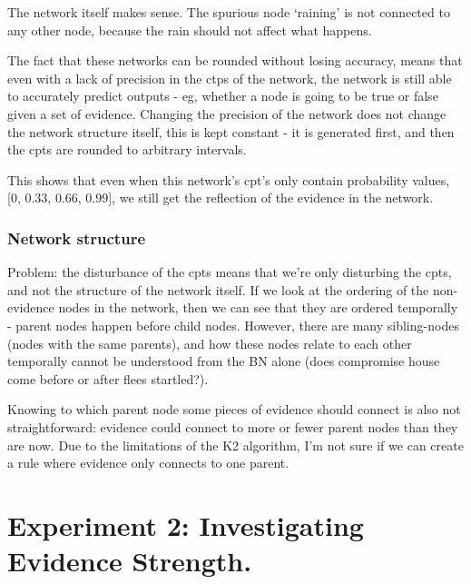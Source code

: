 The network itself makes sense. The spurious node `raining' is not connected to any other node, because the rain should not affect what happens.

The fact that these networks can be rounded without losing accuracy, means that even with a lack of precision in the ctps of the network, the network is still able to accurately predict outputs - eg, whether a node is going to be true or false given a set of evidence. Changing the precision of the network does not change the network structure itself, this is kept constant - it is generated first, and then the cpts are rounded to arbitrary intervals. 

This shows that even when this network's cpt's only contain probability values, [0, 0.33, 0.66, 0.99], we still get the reflection of the evidence in the network. 

\subsubsection{Network structure}

Problem: the disturbance of the cpts means that we're only disturbing the cpts, and not the structure of the network itself. If we look at the ordering of the non-evidence nodes in the network, then we can see that they are ordered temporally - parent nodes happen before child nodes. However, there are many sibling-nodes (nodes with the same parents), and how these nodes relate to each other temporally cannot be understood from the BN alone (does compromise house come before or after flees startled?). 

Knowing to which parent node some pieces of evidence should connect is also not straightforward: evidence could connect to more or fewer parent nodes than they are now. Due to the limitations of the K2 algorithm, I'm not sure if we can create a rule where evidence only connects to one parent.





\section{Experiment 2: Investigating Evidence Strength.}


